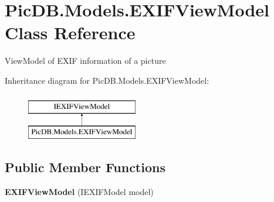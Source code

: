 \hypertarget{class_pic_d_b_1_1_models_1_1_e_x_i_f_view_model}{}\section{Pic\+D\+B.\+Models.\+E\+X\+I\+F\+View\+Model Class Reference}
\label{class_pic_d_b_1_1_models_1_1_e_x_i_f_view_model}


View\+Model of E\+X\+IF information of a picture  


Inheritance diagram for Pic\+D\+B.\+Models.\+E\+X\+I\+F\+View\+Model\+:\begin{figure}[H]
\begin{center}
\leavevmode
\includegraphics[height=2.000000cm]{class_pic_d_b_1_1_models_1_1_e_x_i_f_view_model}
\end{center}
\end{figure}
\subsection*{Public Member Functions}
\begin{DoxyCompactItemize}
\item 
\mbox{\label{class_pic_d_b_1_1_models_1_1_e_x_i_f_view_model_a7f2129775b98d17e3e445f217bcb78df}} 
{\bfseries E\+X\+I\+F\+View\+Model} (I\+E\+X\+I\+F\+Model model)
\end{DoxyCompactItemize}
